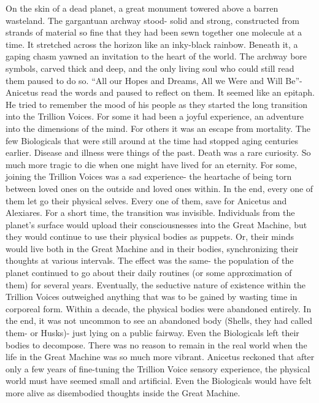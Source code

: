 \documentclass[a4paper]{article}
\begin{document}
On the skin of a dead planet, a great monument towered above a barren wasteland. The gargantuan archway stood- solid and strong, constructed from strands of material so fine that they had been sewn together one molecule at a time. It stretched across the horizon like an inky-black rainbow. Beneath it, a gaping chasm yawned an invitation to the heart of the world. The archway bore symbols, carved thick and deep, and the only living soul who could still read them paused to do so.
“All our Hopes and Dreams, All we Were and Will Be”- Anicetus read the words and paused to reflect on them. It seemed like an epitaph. He tried to remember the mood of his people as they started the long transition into the Trillion Voices.
For some it had been a joyful experience, an adventure into the dimensions of the mind. For others it was an escape from mortality. The few Biologicals that were still around at the time had stopped aging centuries earlier. Disease and illness were things of the past. Death was a rare curiosity. So much more tragic to die when one might have lived for an eternity.
For some, joining the Trillion Voices was a sad experience- the heartache of being torn between loved ones on the outside and loved ones within. In the end, every one of them let go their physical selves. Every one of them, save for Anicetus and Alexiares.
For a short time, the transition was invisible. Individuals from the planet’s surface would upload their consciousnesses into the Great Machine, but they would continue to use their physical bodies as puppets. Or, their minds would live both in the Great Machine and in their bodies, synchronizing their thoughts at various intervals. The effect was the same- the population of the planet continued to go about their daily routines (or some approximation of them) for several years.
Eventually, the seductive nature of existence within the Trillion Voices outweighed anything that was to be gained by wasting time in corporeal form. Within a decade, the physical bodies were abandoned entirely. In the end, it was not uncommon to see an abandoned body (Shells, they had called them- or Husks)- just lying on a public fairway. Even the Biologicals left their bodies to decompose. There was no reason to remain in the real world when the life in the Great Machine was so much more vibrant. Anicetus reckoned that after only a few years of fine-tuning the Trillion Voice sensory experience, the physical world must have seemed small and artificial. Even the Biologicals would have felt more alive as disembodied thoughts inside the Great Machine.
\end{document}
